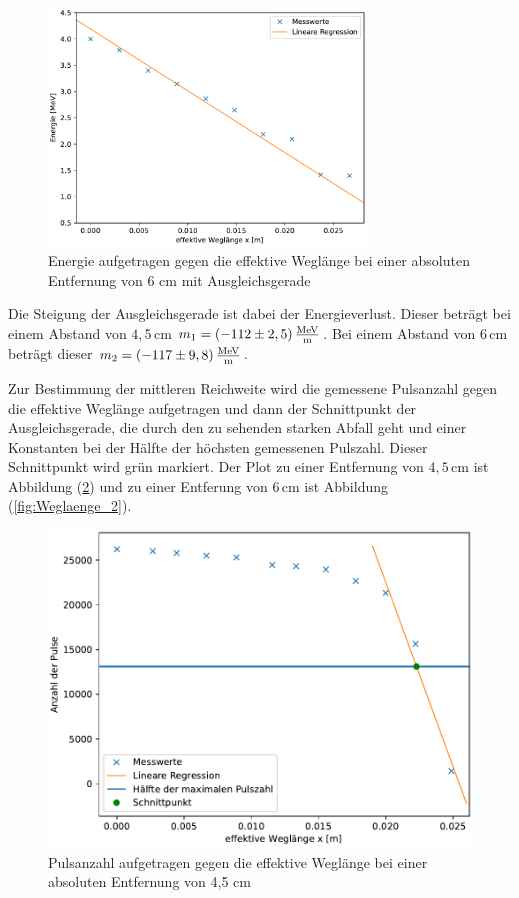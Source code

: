 \begin{figure}[H]
    \centering
    \includegraphics[width=0.75\textwidth]{Plots/plot2.pdf}
    \caption{Energie aufgetragen gegen die effektive Weglänge bei einer absoluten Entfernung von 6 cm mit Ausgleichsgerade}
    \label{fig:Abstand_2}
\end{figure}

Die Steigung der Ausgleichsgerade ist dabei der Energieverlust. Dieser beträgt bei einem Abstand von $4,5 \, \unit{\centi\meter}$ $m_1 = (-112 \pm 2,5)\, 
\unit[per-mode=fraction]{\mega\eV\per\meter}$. Bei einem Abstand von $6 \, \unit{\centi\meter}$ beträgt dieser $m_2 = (-117 \pm 9,8)\, 
\unit[per-mode=fraction]{\mega\eV\per\meter}$. 

Zur Bestimmung der mittleren Reichweite wird die gemessene Pulsanzahl gegen die effektive Weglänge aufgetragen und dann der Schnittpunkt der Ausgleichsgerade, 
die durch den zu sehenden starken Abfall geht und einer Konstanten bei der Hälfte der höchsten gemessenen Pulszahl. Dieser Schnittpunkt wird grün markiert. 
Der Plot zu einer Entfernung von $4,5 \, \unit{\centi\meter}$ ist Abbildung (\ref{fig:Weglaenge_1}) und zu einer Entferung von $6 \, \unit{\centi\meter}$ 
ist Abbildung (\ref{fig:Weglaenge_2}). 

\begin{figure}[H]
    \centering
    \includegraphics[width=\textwidth]{Plots/plot3.pdf}
    \caption{Pulsanzahl aufgetragen gegen die effektive Weglänge bei einer absoluten Entfernung von 4,5 cm}
    \label{fig:Weglaenge_1}
\end{figure}


